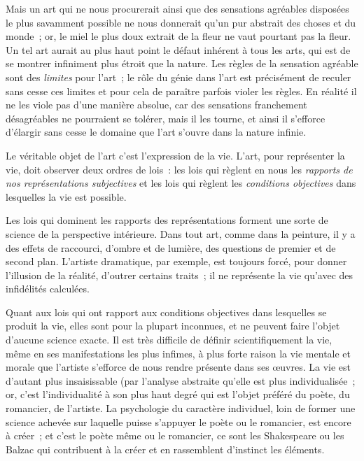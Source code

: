 \documentclass[french,twoside]{book} %
\begin{document}
Mais un art qui ne nous procurerait ainsi que des sensations agréables disposées le plus savamment possible ne nous donnerait qu’un pur abstrait des choses et du monde ; or, le miel le plus doux extrait de la fleur ne vaut pourtant pas la fleur. Un tel art aurait au plus haut point le défaut inhérent à tous les arts, qui est de se montrer infiniment plus étroit que la nature. Les règles de la sensation agréable sont des \emph{limites} pour l’art ; le rôle du génie dans l’art est précisément de reculer sans cesse ces limites et pour cela de paraître parfois violer les règles. En réalité il ne les viole pas d’une manière absolue, car des sensations franchement désagréables ne pourraient se tolérer, mais il les tourne, et ainsi il s’efforce d’élargir sans cesse le domaine que l’art s’ouvre dans la nature infinie.\par
Le véritable objet de l’art c’est l’expression de la vie. L’art, pour représenter la vie, doit observer deux ordres de lois : les lois qui règlent en nous les \emph{rapports de nos représentations subjectives} et les lois qui règlent les \emph{conditions objectives} dans lesquelles la vie est possible.\par
Les lois qui dominent les rapports des représentations forment une sorte de science de la perspective intérieure. Dans tout art, comme dans la peinture, il y a des effets de raccourci, d’ombre et de lumière, des questions de premier et de second plan. L’artiste dramatique, par exemple, est toujours forcé, pour donner l’illusion de la réalité, d’outrer certains traits ; il ne représente la vie qu’avec des infidélités calculées.\par
Quant aux lois qui ont rapport aux conditions objectives dans lesquelles se produit la vie, elles sont pour la plupart inconnues, et ne peuvent faire l’objet d’aucune science exacte. Il est très difficile de définir scientifiquement la vie, même en ses manifestations les plus infimes, à plus forte raison la vie mentale et morale que l’artiste s’efforce de nous rendre présente dans ses œuvres. La vie est d’autant plus insaisissable (par l’analyse abstraite qu’elle est plus individualisée ; or, c’est l’individualité à son plus haut degré qui est l’objet préféré du poète, du romancier, de l’artiste. La psychologie du caractère individuel, loin de former une science achevée sur laquelle puisse s’appuyer le poète ou le romancier, est encore à créer ; et c’est le poète même ou le romancier, ce sont les Shakespeare ou les Balzac qui contribuent à la créer et en rassemblent d’instinct les éléments.\par
\end{document}
